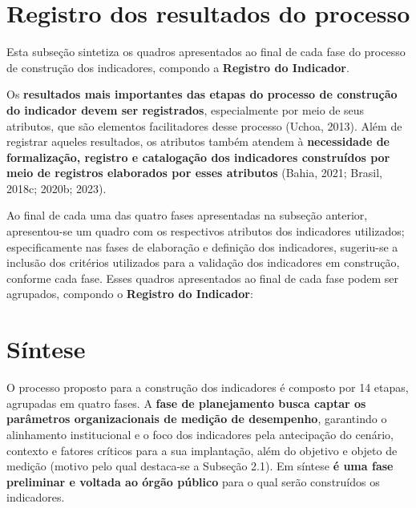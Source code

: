 \documentclass[
  letterpaper,
  DIV=11,
  numbers=noendperiod]{scrreprt}
\begin{document}
\hypertarget{registro-dos-resultados-do-processo}{%
\chapter{Registro dos resultados do
processo}\label{registro-dos-resultados-do-processo}}

{Esta subseção sintetiza os quadros apresentados ao final de cada fase
do processo de construção dos indicadores, compondo a \textbf{Registro
do Indicador}.}

Os \textbf{resultados mais importantes das etapas do processo de
construção do indicador devem ser registrados}, especialmente por meio
de seus atributos, que são elementos facilitadores desse processo
(Uchoa, 2013). Além de registrar aqueles resultados, os atributos também
atendem à \textbf{necessidade de formalização, registro e catalogação
dos indicadores construídos por meio de registros elaborados por esses
atributos} (Bahia, 2021; Brasil, 2018c; 2020b; 2023).

Ao final de cada uma das quatro fases apresentadas na subseção anterior,
apresentou-se um quadro com os respectivos atributos dos indicadores
utilizados; especificamente nas fases de elaboração e definição dos
indicadores, sugeriu-se a inclusão dos critérios utilizados para a
validação dos indicadores em construção, conforme cada fase. Esses
quadros apresentados ao final de cada fase podem ser agrupados, compondo
o \textbf{Registro do Indicador}:

\hypertarget{suxedntese-2}{%
\chapter*{Síntese}\label{suxedntese-2}}


O processo proposto para a construção dos indicadores é composto por 14
etapas, agrupadas em quatro fases. A \textbf{fase de planejamento busca
captar os parâmetros organizacionais de medição de desempenho},
garantindo o alinhamento institucional e o foco dos indicadores pela
antecipação do cenário, contexto e fatores críticos para a sua
implantação, além do objetivo e objeto de medição (motivo pelo qual
destaca-se a Subseção 2.1). Em síntese \textbf{é uma fase preliminar e
voltada ao órgão público} para o qual serão construídos os indicadores.
\end{document}
